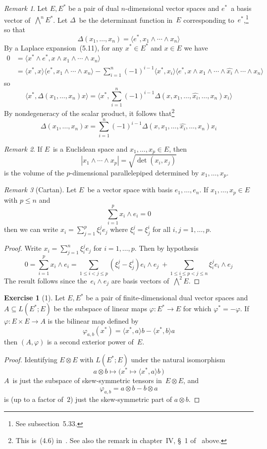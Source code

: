 \documentclass[letterpaper,12pt]{article}
\newcommand{\tprod}{\otimes}
\newcommand{\eprod}{\wedge}
\newcommand{\bigeprod}{\bigwedge}
\newcommand{\medeprod}{{\textstyle\bigeprod}}
\newcommand{\delete}{\widehat}
\newcommand{\sprod}[2]{\langle#1,#2\rangle}
\newcommand{\iprod}[2]{(#1,#2)}
\newcommand{\norm}[1]{|#1|}
\newcommand{\multi}[4]{#2_{#3}#1\cdots#1#2_{#4}}
\newcommand{\eprods}[3]{\multi{\eprod}{#1}{#2}{#3}}
\theoremstyle{definition}
\newtheorem*{exer}{Exercise}
\theoremstyle{remark}
\newtheorem*{rmk}{Remark}
\begin{document}
\begin{rmk}
Let \(E,E^*\) be a pair of dual \(n\)-dimensional vector spaces and \(e^*\)~a basis vector of~\(\medeprod^n E^*\). Let \(\Delta\)~be the determinant function in~\(E\) corresponding to~\(e^*\),\footnote{See subsection~5.33.} so that
\[\Delta(x_1,\ldots,x_n)=\sprod{e^*}{\eprods{x}{1}{n}}\]
By a Laplace expansion~(5.11), for any \(x^*\in E^*\) and \(x\in E\) we have
\begin{align*}
0&=\sprod{x^*\eprod e^*}{x\eprod\eprods{x}{1}{n}}\\
	&=\sprod{x^*}{x}\sprod{e^*}{\eprods{x}{1}{n}}-\sum_{i=1}^n(-1)^{i-1}\sprod{x^*}{x_i}\sprod{e^*}{x\eprod x_1\eprod\cdots\eprod\delete{x_i}\eprod\cdots\eprod x_n}
\end{align*}
so
\[\sprod{x^*}{\Delta(x_1,\ldots,x_n)x}=\sprod{x^*}{\sum_{i=1}^n(-1)^{i-1}\Delta(x,x_1,\ldots,\delete{x_i},\ldots,x_n)x_i}\]
By nondegeneracy of the scalar product, it follows that\footnote{This is~(4.6) in~\cite{greub1}. See also the remark in chapter~IV, \S~1 of~\cite{greub1} above.}
\[\Delta(x_1,\ldots,x_n)x=\sum_{i=1}^n(-1)^{i-1}\Delta(x,x_1,\ldots,\delete{x_i},\ldots,x_n)x_i\]
\end{rmk}

\begin{rmk}
If \(E\)~is a Euclidean space and \(x_1,\ldots,x_p\in E\), then
\[\norm{\eprods{x}{1}{p}}=\sqrt{\det\iprod{x_i}{x_j}}\]
is the volume of the \(p\)-dimensional parallelepiped determined by \(x_1,\ldots,x_p\).
\end{rmk}

\begin{rmk}[Cartan]
Let \(E\)~be a vector space with basis \(e_1,\ldots,e_n\). If \(x_1,\ldots,x_p\in E\) with \(p\le n\) and
\[\sum_{i=1}^p x_i\eprod e_i=0\]
then we can write \(x_i=\sum_{j=1}^p\xi_i^je_j\) where \(\xi_i^j=\xi_j^i\) for all \(i,j=1,\ldots,p\).
\end{rmk}
\begin{proof}
Write \(x_i=\sum_{j=1}^n\xi_i^je_j\) for \(i=1,\ldots,p\). Then by hypothesis
\[0=\sum_{i=1}^p x_i\eprod e_i=\sum_{1\le i<j\le p}(\xi_i^j-\xi_j^i)e_i\eprod e_j\ +\sum_{1\le i\le p<j\le n}\xi_i^j e_i\eprod e_j\]
The result follows since the~\(e_i\eprod e_j\) are basis vectors of~\(\medeprod^2 E\).
\end{proof}

\begin{exer}[1]
Let \(E,E^*\) be a pair of finite-dimensional dual vector spaces and \(A\subseteq L(E^*;E)\) be the subspace of linear maps \(\varphi:E^*\to E\) for which \(\varphi^*=-\varphi\). If \(\varphi:E\times E\to A\) is the bilinear map defined by
\[\varphi_{a,b}(x^*)=\sprod{x^*}{a}b-\sprod{x^*}{b}a\]
then \((A,\varphi)\) is a second exterior power of~\(E\).
\end{exer}
\begin{proof}
Identifying \(E\tprod E\) with \(L(E^*;E)\) under the natural isomorphism
\[a\tprod b\mapsto\bigl(x^*\mapsto\sprod{x^*}{a}b\,\bigr)\]
\(A\)~is just the subspace of skew-symmetric tensors in~\(E\tprod E\), and
\[\varphi_{a,b}=a\tprod b-b\tprod a\]
is (up to a factor of~\(2\)) just the skew-symmetric part of \(a\tprod b\).
\end{proof}
\end{document}

